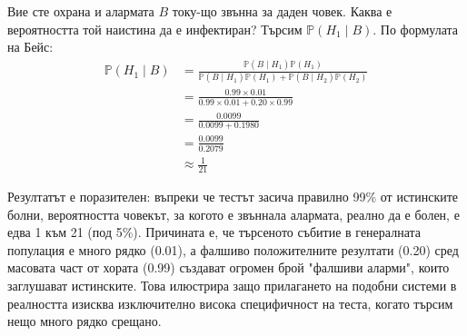 \documentclass{article}
\begin{document}
Вие сте охрана и алармата $B$ току-що звънна за даден човек. Каква е вероятността той наистина да е инфектиран? Търсим $\mathbb{P}(H_1 \mid B)$.
По формулата на Бейс:
\begin{align*}
\mathbb{P}(H_1 \mid B) &= \frac{\mathbb{P}(B \mid H_1)\mathbb{P}(H_1)}{\mathbb{P}(B \mid H_1)\mathbb{P}(H_1) + \mathbb{P}(B \mid H_2)\mathbb{P}(H_2)} \\
&= \frac{0.99 \times 0.01}{0.99 \times 0.01 + 0.20 \times 0.99} \\
&= \frac{0.0099}{0.0099 + 0.1980} \\
&= \frac{0.0099}{0.2079} \\
&\approx \frac{1}{21}
\end{align*}

Резултатът е поразителен: въпреки че тестът засича правилно 99\% от истинските болни, вероятността човекът, за когото е звъннала алармата, реално да е болен, е едва 1 към 21 (под 5\%). Причината е, че търсеното събитие в генералната популация е много рядко (0.01), а фалшиво положителните резултати (0.20) сред масовата част от хората (0.99) създават огромен брой "фалшиви аларми", които заглушават истинските. Това илюстрира защо прилагането на подобни системи в реалността изисква изключително висока специфичност на теста, когато търсим нещо много рядко срещано.
\end{document}
